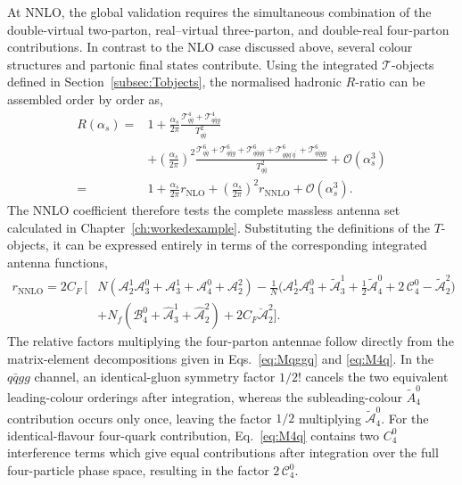 At NNLO, the global validation requires the simultaneous combination of the double-virtual
two-parton, real--virtual three-parton, and double-real four-parton contributions. In contrast to the
NLO case discussed above, several colour structures and partonic final states contribute. Using the
integrated $\mathcal T$-objects defined in Section~\ref{subsec:Tobjects}, the normalised hadronic
$R$-ratio can be assembled order by order as,
\begin{equation}
    \begin{split}
        R(\alpha_s) ={}& 1 + \frac{\alpha_s}{2\pi}\frac{\mathcal T_{q\bar q}^4+\mathcal T_{q\bar qg}^4}{T_{q\bar q}^2}\\
                       &+ \left(\frac{\alpha_s}{2\pi}\right)^2\frac{\mathcal T_{q\bar q}^6+\mathcal T_{q\bar qg}^6+\mathcal T_{q\bar q q\bar q}^6+\mathcal T_{q\bar q q^\prime\bar q^\prime}^6+\mathcal T_{q\bar q gg}^6}{T_{q\bar q}^2} + \mathcal O\!\left(\alpha_s^3\right)\\
                       ={}& 1 + \frac{\alpha_s}{2\pi}r_\text{NLO} + \left(\frac{\alpha_s}{2\pi}\right)^2r_\text{NNLO} + \mathcal O\!\left(\alpha_s^3\right).
    \end{split}
\end{equation}
The NNLO coefficient therefore tests the complete massless antenna set calculated in
Chapter~\ref{ch:workedexample}. Substituting the definitions of the $T$-objects, it can be expressed
entirely in terms of the corresponding integrated antenna functions,
\begin{equation}\label{eq:rNNLO}
    \begin{split}
        r_\text{NNLO} = 2C_F\,\Bigg[&N\!\left(\mathcal A_2^1\mathcal A_3^0+\mathcal A_3^1+\mathcal A_4^0+\mathcal A_2^2\right)-\frac1N\!\Big(\mathcal A_2^1\mathcal A_3^0+\tilde{\mathcal A}_3^1+\tfrac12\tilde{\mathcal A}_4^0+2\,\mathcal C_4^0-\tilde{\mathcal A}_2^2\Big)\\
                                    &+N_f\!\left(\mathcal B_4^0+\hat{\mathcal A}_3^1+\hat{\mathcal A}_2^2\right)+2C_F\breve{\mathcal A}_2^2\Bigg].
    \end{split}
\end{equation}
The relative factors multiplying the four-parton antennae follow directly from the matrix-element
decompositions given in Eqs.~\eqref{eq:Mqggq} and \eqref{eq:M4q}. In the $q\bar qgg$ channel, an
identical-gluon symmetry factor $1/2!$ cancels the two equivalent leading-colour orderings after
integration, whereas the subleading-colour $\tilde A_4^0$ contribution occurs only once, leaving the
factor $1/2$ multiplying $\tilde{\mathcal A}_4^0$. For the identical-flavour four-quark contribution,
Eq.~\eqref{eq:M4q} contains two $C_4^0$ interference terms which give equal contributions after
integration over the full four-particle phase space, resulting in the factor $2\,\mathcal C_4^0$.

